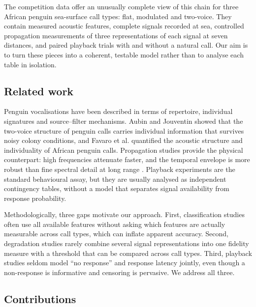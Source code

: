 \documentclass{apmcmthesis}
\begin{document}
The competition data offer an unusually complete view of this chain for three African penguin sea-surface call types: flat, modulated and two-voice. They contain measured acoustic features, complete signals recorded at sea, controlled propagation measurements of three representations of each signal at seven distances, and paired playback trials with and without a natural call. Our aim is to turn these pieces into a coherent, testable model rather than to analyse each table in isolation.

\subsection{Related work}

Penguin vocalisations have been described in terms of repertoire, individual signatures and source--filter mechanisms. Aubin and Jouventin \cite{aubin2002} showed that the two-voice structure of penguin calls carries individual information that survives noisy colony conditions, and Favaro et al. \cite{favaro2014,favaro2015} quantified the acoustic structure and individuality of African penguin calls. Propagation studies provide the physical counterpart: high frequencies attenuate faster, and the temporal envelope is more robust than fine spectral detail at long range \cite{wiley1978}. Playback experiments are the standard behavioural assay, but they are usually analysed as independent contingency tables, without a model that separates signal availability from response probability.

Methodologically, three gaps motivate our approach. First, classification studies often use all available features without asking which features are actually measurable across call types, which can inflate apparent accuracy. Second, degradation studies rarely combine several signal representations into one fidelity measure with a threshold that can be compared across call types. Third, playback studies seldom model ``no response'' and response latency jointly, even though a non-response is informative and censoring is pervasive. We address all three.

\subsection{Contributions}
\end{document}
